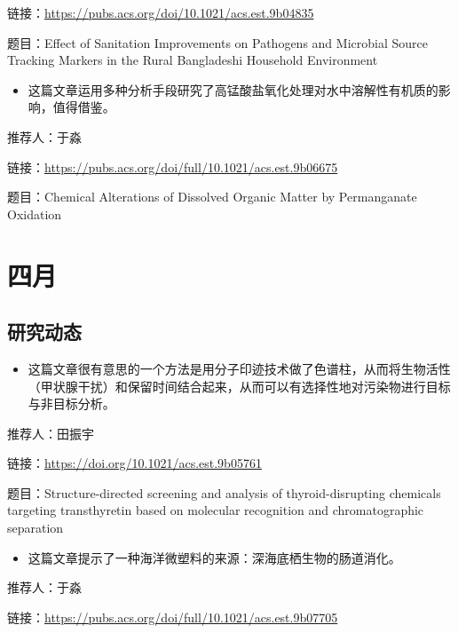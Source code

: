 \documentclass[
]{book}
\providecommand{\tightlist}{%
  \setlength{\itemsep}{0pt}\setlength{\parskip}{0pt}}
\begin{document}
链接：\url{https://pubs.acs.org/doi/10.1021/acs.est.9b04835}

题目：Effect of Sanitation Improvements on Pathogens and Microbial Source Tracking Markers in the Rural Bangladeshi Household Environment

\begin{itemize}
\tightlist
\item
  这篇文章运用多种分析手段研究了高锰酸盐氧化处理对水中溶解性有机质的影响，值得借鉴。
\end{itemize}

推荐人：于淼

链接：\url{https://pubs.acs.org/doi/full/10.1021/acs.est.9b06675}

题目：Chemical Alterations of Dissolved Organic Matter by Permanganate Oxidation

\hypertarget{ux56dbux6708-2}{%
\section*{四月}\label{ux56dbux6708-2}}

\hypertarget{ux7814ux7a76ux52a8ux6001-29}{%
\subsection*{研究动态}\label{ux7814ux7a76ux52a8ux6001-29}}

\begin{itemize}
\tightlist
\item
  这篇文章很有意思的一个方法是用分子印迹技术做了色谱柱，从而将生物活性（甲状腺干扰）和保留时间结合起来，从而可以有选择性地对污染物进行目标与非目标分析。
\end{itemize}

推荐人：田振宇

链接：\url{https://doi.org/10.1021/acs.est.9b05761}

题目：Structure-directed screening and analysis of thyroid-disrupting chemicals targeting transthyretin based on molecular recognition and chromatographic separation

\begin{itemize}
\tightlist
\item
  这篇文章提示了一种海洋微塑料的来源：深海底栖生物的肠道消化。
\end{itemize}

推荐人：于淼

链接：\url{https://pubs.acs.org/doi/full/10.1021/acs.est.9b07705}
\end{document}
